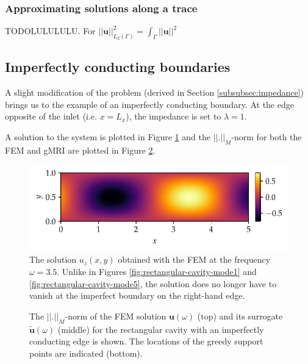 \documentclass[11pt, a4paper]{article}
\begin{document}
\subsubsection{Approximating solutions along a trace}
\label{subsubsec:traces}
 
TODOLULULULU.
For $||\mathbf{u}||_{L_2(\Gamma)}^2 = \int_{\Gamma} ||\mathbf{u}||^2$

\subsection{Imperfectly conducting boundaries}
\label{subsec:examples-impedance}

A slight modification of the problem (derived in Section \ref{subsubsec:impedance})
brings us to the example of an imperfectly conducting boundary. At the edge 
opposite of the inlet (i.e. $x=L_x$), the impedance is set to $\lambda=1$.

A solution to the system is plotted in Figure \ref{fig:imperfect-conductor-solution}
and the $||.||_M$-norm for both the \acrshort{FEM} and \acrshort{gMRI}
are plotted in Figure \ref{fig:imperfect-conductor-norms}.

\begin{figure}[ht]
    \centering
    \includegraphics{plots/imperfect_conductor_solution.pdf}
    \caption{The solution $u_z(x, y)$ obtained with the \acrshort{FEM} at the
    frequency $\omega = 3.5$. Unlike in Figures \ref{fig:rectangular-cavity-mode1}
    and \ref{fig:rectangular-cavity-mode5}, the solution does no longer have to
    vanish at the imperfect boundary on the right-hand edge.}
    \label{fig:imperfect-conductor-solution}
\end{figure}

\begin{figure}[ht]
    \centering
    
    \caption{The $||.||_M$-norm of the \acrshort{FEM} solution $\mathbf{u}(\omega)$ (top) and
    its surrogate $\mathbf{\tilde{u}}(\omega)$ (middle) for the rectangular cavity with
    an imperfectly conducting edge is shown. The locations of the greedy support
    points are indicated (bottom).}
    \label{fig:imperfect-conductor-norms}
\end{figure}
\end{document}
